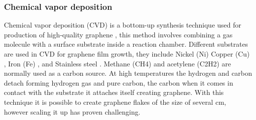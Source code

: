 \subsubsection*{Chemical vapor deposition}
Chemical vapor deposition (CVD) is a bottom-up synthesis technique used for production of high-quality graphene \cite{brownson2012electrochemistry}, this method involves combining a gas molecule with a surface substrate inside a reaction chamber. Different substrates are used in CVD for graphene film growth, they include Nickel (Ni)  \cite{yavari2011high} Copper (Cu) \cite{seekaew2017highly}, Iron (Fe) \cite{an2011graphene}, and Stainless steel \cite{ghaemi2016synthesis}. Methane (CH4) and acetylene (C2H2) are normally used as a carbon source. At high temperatures the hydrogen and carbon detach forming hydrogen gas and pure carbon, the carbon when it comes in contact with the substrate it attaches itself creating graphene. With this technique it is possible to create graphene flakes of the size of several cm, however scaling it up has proven challenging.